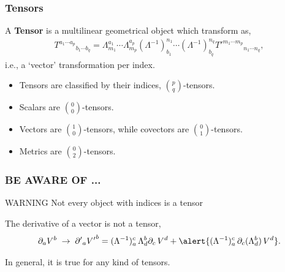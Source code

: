\begin{frame}
  \frametitle{Tensors}
  \begin{definition}
    A \alert{\bf Tensor} is a multilinear geometrical  object which transform as,
    \begin{align*}
      T^{a_1\cdots a_p}{}_{b_1\cdots b_q} =  \Lambda^{a_1}_{m_1} \cdots  \Lambda^{a_p}_{m_p}(\Lambda^{-1})^{n_1}_{b_1} \cdots (\Lambda^{-1})^{n_q}_{b_q} {T'}^{m_1\cdots m_p}{}_{n_1\cdots n_q},
    \end{align*}
    i.e., a `vector' transformation per index.
  \end{definition}
  \begin{itemize}
  \item Tensors are classified by their indices, $\binom{p}{q}$-tensors.
  \item Scalars are $\binom{0}{0}$-tensors.
  \item Vectors are $\binom{1}{0}$-tensors, while covectors are $\binom{0}{1}$-tensors.
  \item Metrics are $\binom{0}{2}$-tensors.
  \end{itemize}
\end{frame}


\begin{frame}
  \frametitle{BE AWARE OF ...}
  \begin{alertblock}{WARNING}
    Not every object with indices is a  tensor
  \end{alertblock}
  \begin{example}
    The derivative of a vector is not a tensor,
    \begin{align*}
      \partial_a V^b \;\to \;{\partial'}_a {V'}^b = (\Lambda^{-1})_a^c\, \Lambda^b_d\partial_c\, V^d + \alert{(\Lambda^{-1})_a^c\,\partial_c(\Lambda^b_d) \,V^d }.
    \end{align*}

    In general, it is true for any kind of tensors.
  \end{example}
\end{frame}


